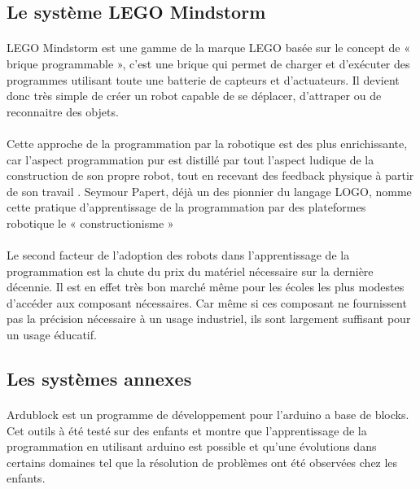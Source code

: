 \documentclass[a4paper]{article}
\begin{document}
\subsection{Le système LEGO Mindstorm}

\paragraph{}
LEGO Mindstorm est une gamme de la marque LEGO basée sur le concept de « brique programmable », c’est une brique qui permet de charger et d’exécuter des programmes utilisant toute une batterie de capteurs et d’actuateurs. Il devient donc très simple de créer un robot capable de se déplacer, d’attraper ou de reconnaitre des objets. \cite{martin1993lego}

\paragraph{}
Cette approche de la programmation par la robotique est des plus enrichissante, car l’aspect programmation pur est distillé par tout l’aspect ludique de la construction de son propre robot, tout en recevant des feedback physique à partir de son travail \cite{weinberg2003robotics}. Seymour Papert, déjà un des pionnier du langage LOGO, nomme cette pratique d’apprentissage de la programmation par des plateformes robotique le « constructionisme » \cite{Papert:1980:MCC:1095592}

\paragraph{}
Le second facteur de l’adoption des robots dans l’apprentissage de la programmation est la chute du prix du matériel nécessaire sur la dernière décennie. Il est en effet très bon marché même pour les écoles les plus modestes d’accéder aux composant nécessaires. Car même si ces composant ne fournissent pas la précision nécessaire à un usage industriel, ils sont largement suffisant pour un usage éducatif.

\subsection{Les systèmes annexes}

\paragraph{}
Ardublock est un programme de développement pour l'arduino a base de blocks. Cet outils à été testé sur des enfants et montre que l'apprentissage de la programmation en utilisant arduino est possible et qu'une évolutions dans certains domaines tel que la résolution de problèmes ont été observées chez les enfants.  \cite{sohn2014design}
\end{document}
